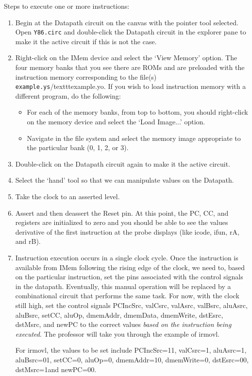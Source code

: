\documentclass[11pt]{article}
\begin{document}
Steps to execute one or more instructions:
\begin{enumerate}
\item Begin at the Datapath circuit on the canvas with the pointer tool selected. Open \texttt{Y86.circ} and double-click the Datapath circuit in the explorer pane to make it the active circuit if this is not the case.
\item Right-click on the IMem device and select the `View Memory' option.  The four memory banks that you see there are ROMs and are preloaded with the instruction memory corresponding to the file(s) \texttt{example.ys}/texttt{example.yo}.  If you wish to load instruction memory with a different program, do the following:
\begin{itemize}
\item For each of the memory banks, from top to bottom, you should right-click on the memory device and select the `Load Image...' option.
\item Navigate in the file system and select the memory image appropriate to the particular bank (0, 1, 2, or 3).
\end{itemize}
\item Double-click on the Datapath circuit again to make it the active circuit.
\item Select the `hand' tool so that we can manipulate values on the Datapath.
\item Take the clock to an asserted level.
\item Assert and then deassert the Reset pin.  At this point, the PC, CC, and registers are initialized to zero and you should be able to see the values derivative of the first instruction at the probe displays (like icode, ifun, rA, and rB).
\item \label{cyclestart} Instruction execution occurs in a single clock cycle.  Once the instruction is available from IMem following the rising edge of the clock, we need to, based on the particular instruction, set the pins associated with the control signals in the datapath.  Eventually, this manual operation will be replaced by a combinational circuit that performs the same task.  For now, with the clock still high, set the control signals PCIncSrc, valCsrc, valAsrc, valBsrc, aluAsrc, aluBsrc, setCC, aluOp, dmemAddr, dmemData, dmemWrite, dstEsrc, dstMsrc, and newPC to the correct values {\em based on the instruction being executed}.  The professor will take you through the example of irmovl.  

For irmovl, the values to be set include PCIncSrc=11, valCsrc=1, aluAsrc=1, aluBsrc=01, setCC=0, aluOp=0, dmemAddr=10, dmemWrite=0, dstEsrc=00, dstMsrc=1and newPC=00.  


\end{enumerate}
\end{document}

